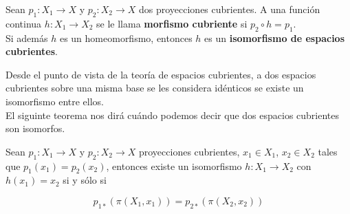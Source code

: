 \begin{definition}

Sean $p_1:X_1 \rightarrow X$ y $p_2: X_2 \rightarrow X$ dos proyecciones cubrientes. A una funci\'on continua $h:X_1 \rightarrow X_2$ se le llama \textbf{morfismo cubriente} si $p_2 \circ h = p_1$.\\

Si adem\'as $h$ es un homeomorfismo, entonces $h$ es un \textbf{isomorfismo de espacios cubrientes}.\\

\end{definition}

Desde el punto de vista de la teor\'ia de espacios cubrientes, a dos espacios cubrientes sobre una misma base se les considera id\'enticos se existe un isomorfismo entre ellos.\\
El siguinte teorema nos dir\'a cu\'ando podemos decir que dos espacios cubrientes son isomorfos.\\

\begin{theorem}\label{Iso}

Sean $p_1: X_1 \rightarrow X$ y $p_2: X_2 \rightarrow X$ proyecciones cubrientes, $x_1 \in X_1$, $x_2 \in X_2$ tales que $p_1(x_1)=p_2(x_2)$, entonces existe un isomorfismo $h:X_1 \rightarrow X_2$ con $h(x_1)=x_2$ si y s\'olo si 

$$p_{1*}(\pi (X_1,x_1))= p_{2*}(\pi(X_2,x_2))$$

\end{theorem}

